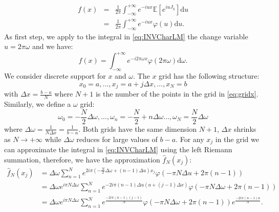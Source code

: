\begin{eqnarray}
f\left(x\right) &=& \frac{1}{2\pi}\int_{-\infty}^{+\infty} e^{-iux}\mathbb{E}\left[e^{iu J_h}\right] \mbox{d}u \nonumber \\
&=& \frac{1}{2\pi}\int_{-\infty}^{+\infty} e^{-iux}\varphi\left(u\right) \mbox{d}u.
\label{eq:INVCharLM}
\end{eqnarray}
As first step, we apply to the integral in \eqref{eq:INVCharLM} the change variable \(u = 2\pi \omega\) and we have:
\begin{equation}
f\left(x\right) = \int_{-\infty}^{+\infty} e^{-i 2\pi\omega x}\varphi\left(2\pi\omega\right) \mbox{d}\omega.
\end{equation}
We consider discrete support for \(x\) and \(\omega\). The \(x\) grid has the following structure:
\begin{equation}
x_0 =a, \ldots, x_j=a+ j \Delta x, \ldots, x_N=b
\label{eq:gridx}
\end{equation}
with \(\Delta x =\frac{b-a}{N}\) where \(N+1\) is the number of the points in the grid in \eqref{eq:gridx}.
Similarly, we define a \(\omega\) grid:
\begin{equation}
\omega_0= -\frac{N}{2} \Delta \omega, \ldots,  \omega_n = -\frac{N}{2} + n \Delta \omega  \ldots, \omega_N = \frac{N}{2}\Delta \omega
\label{eq:omegagrid}
\end{equation}
where \(\Delta \omega = \frac{1}{N \Delta x} = \frac{1}{b-a}\). Both grids have the same dimension \(N+1\), \(\Delta x\) shrinks as \(N \rightarrow +\infty\) while \(\Delta \omega\) reduces for large values of \(b-a\).
For any \(x_j\) in the grid we can approximate the integral in \eqref{eq:INVCharLM} using the left Riemann summation, therefore, we have the approximation \(\hat{f}_{N}\left(x_j\right)\):
\begin{align}
\hat{f}_{N}\left(x_j\right) &= \Delta \omega \sum_{n=1}^{N}e^{2 i\pi \left(-\frac{N}{2}\Delta \omega +\left(n-1\right) \Delta u\right)x_j}\varphi\left(-\pi N\Delta u + 2\pi \left(n-1\right)\right)\nonumber\\
&= \Delta \omega e^{i\pi N \Delta \omega} \sum_{n=1}^{N}e^{- 2 i \pi \left(n-1\right)\Delta u \left(a+\left(j-1\right) \Delta x\right)}\varphi\left(-\pi N\Delta \omega + 2\pi \left(n-1\right)\right)\nonumber\\
&= \Delta \omega e^{i\pi N \Delta \omega}\sum_{n=1}^{N}e^{\frac{- 2 i \pi\left(n-1\right)\left(j-1\right)}{N}}\varphi\left(-\pi N\Delta \omega + 2\pi \left(n-1\right)\right)e^{\frac{-2i\pi \left(n-1\right)a}{N}}.
\label{eq:FFTDens}
\end{align}
